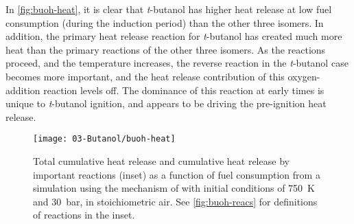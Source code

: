 \documentclass[12pt, letterpaper]{article}
\begin{document}
In \autoref{fig:buoh-heat}, it is clear that \textit{t}-butanol has higher
heat release at low fuel consumption (during the induction period) than the
other three isomers. In addition, the primary heat release reaction for
\textit{t}-butanol has created much more heat than the primary reactions of the
other three isomers. As the reactions proceed, and the temperature increases,
the reverse reaction in the \textit{t}-butanol case becomes more important, and
the heat release contribution of this oxygen-addition reaction levels off. The
dominance of this reaction at early times is unique to \textit{t}-butanol
ignition, and appears to be driving the pre-ignition heat release.

\begin{figure}
    \texttt{[image: 03-Butanol/buoh-heat]}
    \caption{Total cumulative heat release and cumulative heat release by
        important reactions (inset) as a function of fuel consumption from a
        simulation using the mechanism of \textcite{Sarathy2012} with initial
        conditions of \SI{750}{\kelvin} and \SI{30}{\bar}, in stoichiometric air. See
        \autoref{fig:buoh-reacs} for definitions of reactions in the inset.}
    \label{fig:buoh-heat}
\end{figure}
\end{document}
